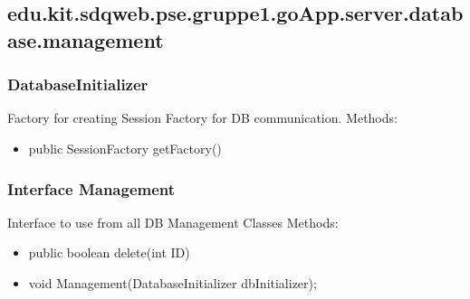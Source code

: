 	\subsection{edu.kit.sdqweb.pse.gruppe1.goApp.server.database.management}	

	\subsubsection{DatabaseInitializer}
	Factory for creating Session Factory for DB communication.
	\newline Methods:
	\begin{itemize}
		\item public SessionFactory getFactory()
	\end{itemize}
	
	\subsubsection{Interface Management}
	Interface to use from all DB Management Classes
	\newline Methods:
	\begin{itemize} 
		\item public boolean delete(int ID)			
		
		\item void Management(DatabaseInitializer dbInitializer);
	\end{itemize}
	
